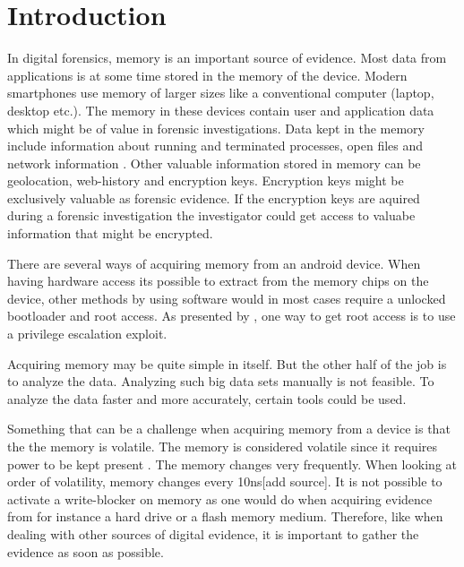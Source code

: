 \section{Introduction}


In digital forensics, memory is an important source of evidence. Most data from applications
is at some time stored in the memory of the device. Modern smartphones use memory of larger sizes like 
a conventional computer (laptop, desktop etc.). The memory in these devices contain user and 
application data which might be of value in forensic investigations. Data kept in the memory include 
information about running and terminated processes, open files and network information 
\cite{acq_vol_android_mem}. Other valuable information stored in memory can be geolocation, web-history 
and encryption keys. Encryption keys might be exclusively valuable as forensic evidence.
If the encryption keys are aquired during a forensic investigation the investigator could get access to 
valuabe information that might be encrypted.

There are several ways of acquiring memory from an android device. When having hardware access its possible to extract from the memory chips on the device, other methods by using software would in most cases require a unlocked bootloader and root access. As presented by \cite{acq_vol_android_mem}, one way to get root access is to use a privilege escalation exploit. %

Acquiring memory may be quite simple in itself. But the other half of the job is to analyze the data.
Analyzing such big data sets manually is not feasible. To analyze the data faster and more accurately, certain tools could be used.



Something that can be a challenge when acquiring memory from a device is that the the memory is 
volatile. The memory is considered volatile since it requires power to be kept present \cite{the_art_of_mem}.
The memory changes very frequently. When looking at order of volatility, memory changes 
every 10ns[add source]. It is not possible to activate a write-blocker on memory as one would do when 
acquiring evidence from for instance a hard drive or a flash memory medium. Therefore, like when dealing with other sources of digital
evidence, it is important to gather the evidence as soon as possible. 

